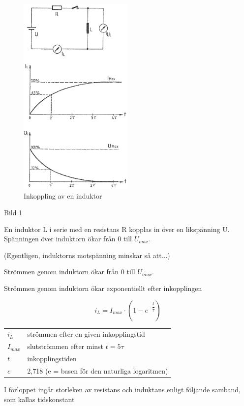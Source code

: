 \begin{figure}
\includegraphics[width=0.5\textwidth]{images/cropped_pdfs/bild_2_3-10.pdf}
\caption{Inkoppling av en induktor}
\label{fig:BildII3-10}
\end{figure}

Bild \ref{fig:BildII3-10}

En induktor L i serie med en resistans R kopplas in över en likspänning U.
Spänningen över induktorn ökar från 0 till \(U_{max}\).

(Egentligen, induktorns motspänning minskar så att...)

Strömmen genom induktorn ökar från 0 till \(U_{max}\).

Strömmen genom induktorn ökar exponentiellt efter inkopplingen

\[i_L = I_{max} \cdot (1-e^{-\dfrac{t}{\tau}} )\]

\begin{tabular}{lp{}}
  \(i_L\) &  strömmen efter en given inkopplingstid \\
  \(I_{max}\) & slutströmmen efter minst \(t = 5\tau\) \\
  \(t\) & inkopplingstiden \\
  \(e\) & 2,718 (e = basen för den naturliga logaritmen) \\
\end{tabular}

I förloppet ingår storleken av resistans och induktans enligt följande samband,
som kallas tidskonstant

